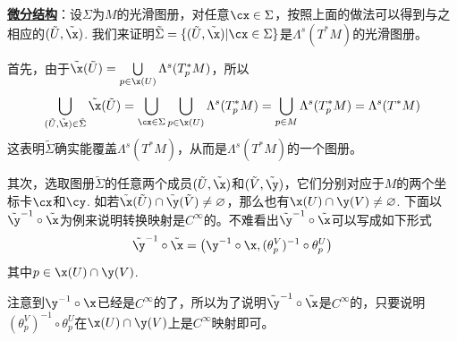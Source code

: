 \textbf{\underline{微分结构}}：设$\Sigma$为$M$的光滑图册，对任意$\cx\in\Sigma$，按照上面的做法可以得到与之相应的$(\tilde{  U  },\tilde{  \x  })$. 我们来证明$\tilde{  \Sigma  }=\{(\tilde{  U  },\tilde{  \x  }) | \cx\in \Sigma\}$是$\Lambda^{s}(T^{\ast}M)$的光滑图册。

首先，由于$\tilde{  \x  }(\tilde{  U  })=\bigcup\limits_{p\in \x(U)}\Lambda^{s}(T^{\ast}_{p}M)$，所以
	\[
		\bigcup\limits_{(\tilde{  U  },\tilde{  \x  })\in \tilde{  \Sigma  }}\tilde{  \x  }(\tilde{  U  })=\bigcup\limits_{\cx\in\Sigma}\bigcup\limits_{p\in \x(U)}\Lambda^{s}(T^{\ast}_{p}M)=\bigcup\limits_{p\in M}\Lambda^{s}(T^{\ast}_{p}M)=\Lambda^{s}(T^{\ast}M)
		\]
这表明$\tilde{  \Sigma  }$确实能覆盖$\Lambda^{s}(T^{\ast}M)$，从而是$\Lambda^{s}(T^{\ast}M)$的一个图册。
		
其次，选取图册$\tilde{  \Sigma  }$的任意两个成员$(\tilde{  U  },\tilde{  \x  })$和$(\tilde{  V  },\tilde{  \y  }) $，它们分别对应于$M$的两个坐标卡$\cx$和$\cy$. 如若$\tilde{  \x  }(\tilde{  U  })\cap\tilde{  \y  }(\tilde{  V  })\neq\varnothing$，那么也有$\x(U)\cap\y(V)\neq\varnothing$. 下面以$\tilde{  \y  }^{-1}\circ \tilde{  \x }$为例来说明转换映射是$C^{\infty}$的。不难看出$\tilde{  \y  }^{-1}\circ \tilde{  \x }$可以写成如下形式
	\[
		\tilde{  \y  }^{-1}\circ \tilde{  \x }
		=\left(\y^{-1}\circ\x,(\theta^{V}_{p})^{-1}\circ\theta^{U}_{p}\right)
	\]
其中$p\in \x(U)\cap\y(V)$. 
		
注意到$\y^{-1}\circ\x$已经是$C^{\infty}$的了，所以为了说明$\tilde{  \y  }^{-1}\circ \tilde{  \x }$是$C^{\infty}$的，只要说明$\left(\theta^{V}_{p}\right)^{-1}\circ\theta^{U}_{p}$在$\x(U)\cap\y(V)$上是$C^{\infty}$映射即可。
		
